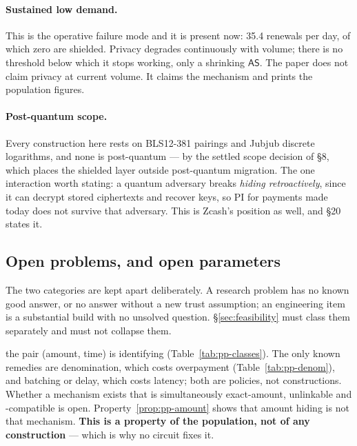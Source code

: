 \paragraph{Sustained low demand.} This is the operative failure mode and it is present now:
\num{35.4} renewals per day, of which zero are shielded. Privacy degrades continuously with volume;
there is no threshold below which it stops working, only a shrinking $\mathsf{AS}$. The paper does not
claim privacy at current volume. It claims the mechanism and prints the population figures.

\paragraph{Post-quantum scope.} Every construction here rests on BLS12-381 pairings and Jubjub
discrete logarithms, and none is post-quantum --- by the settled scope decision of \S8, which places
the shielded layer outside post-quantum migration. The one interaction worth stating: a quantum
adversary breaks \emph{hiding retroactively}, since it can decrypt stored ciphertexts and recover
keys, so PI for payments made today does not survive that adversary. This is Zcash's position as well,
and \S20 states it.

\subsection{Open problems, and open parameters}
\label{sec:pp-open}

The two categories are kept apart deliberately. A research problem has no known good answer, or no
answer without a new trust assumption; an engineering item is a substantial build with no unsolved
question. \S\ref{sec:feasibility} must class them separately and must not collapse them.

\begin{openproblem}
\label{op:pp-r1}
 the pair (amount, time) is identifying
(Table~\ref{tab:pp-classes}). The only known remedies are denomination, which costs overpayment
(Table~\ref{tab:pp-denom}), and batching or delay, which costs latency; both are policies, not
constructions. Whether a mechanism exists that is simultaneously exact-amount, unlinkable and
\PNR-compatible is open. Property~\ref{prop:pp-amount} shows that amount hiding is not that
mechanism. \textbf{This is a property of the population, not of any construction} --- which is why no
circuit fixes it.
\end{openproblem}

